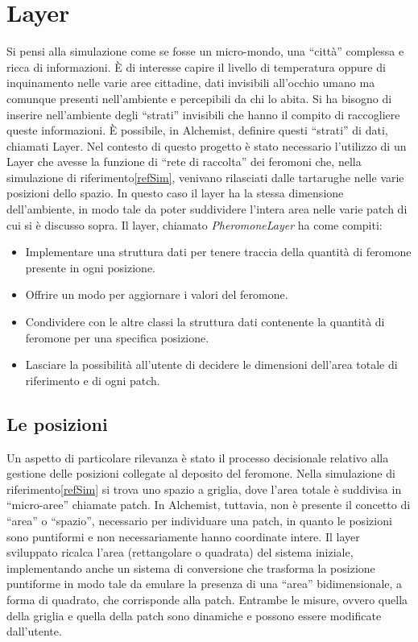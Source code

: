 \documentclass[12pt,a4paper,openright,twoside]{book}
\begin{document}
\section{Layer}
Si pensi alla simulazione come se fosse un micro-mondo, una ``città'' complessa
e ricca di informazioni. È di interesse capire il livello di temperatura oppure di inquinamento nelle varie aree cittadine, dati invisibili
all'occhio umano ma comunque presenti nell'ambiente e percepibili da chi lo abita. Si ha bisogno
di inserire nell'ambiente degli ``strati'' invisibili che hanno il compito di raccogliere queste informazioni.
È possibile, in Alchemist, definire questi ``strati'' di dati, chiamati Layer.
\newline
Nel contesto di questo progetto è stato necessario l'utilizzo di un Layer che avesse la funzione di ``rete di raccolta''
dei feromoni che, nella simulazione di riferimento\space\ref{refSim}, venivano rilasciati dalle tartarughe nelle varie posizioni
dello spazio. In questo caso il layer ha la stessa dimensione dell'ambiente, in modo tale da poter suddividere l'intera area nelle varie patch di cui si 
è discusso sopra.
Il layer, chiamato \textit{PheromoneLayer} ha come compiti:
\begin{itemize}
    \item Implementare una struttura dati per tenere traccia della quantità di feromone presente in ogni posizione.
    \item Offrire un modo per aggiornare i valori del feromone.
    \item Condividere con le altre classi la struttura dati contenente la quantità di feromone per una specifica posizione.
    \item Lasciare la possibilità all'utente di decidere le dimensioni dell'area totale di riferimento e di ogni patch.
\end{itemize}

\subsection{Le posizioni}
Un aspetto di particolare rilevanza è stato il processo decisionale relativo alla gestione delle posizioni collegate 
al deposito del feromone. Nella simulazione di riferimento\space\ref{refSim} si trova uno spazio a griglia, dove l'area totale è suddivisa
in ``micro-aree'' chiamate patch. In Alchemist, tuttavia, non è presente il concetto di ``area'' o ``spazio'', necessario per individuare una patch,
in quanto le posizioni sono puntiformi e non necessariamente hanno coordinate intere. Il layer sviluppato ricalca l'area (rettangolare o quadrata) del sistema iniziale,
implementando anche un sistema di conversione che trasforma la posizione puntiforme in modo tale da emulare la presenza di una ``area'' bidimensionale, a forma di quadrato, che corrisponde alla patch.
Entrambe le misure, ovvero quella della griglia e quella della patch sono dinamiche e possono essere modificate dall'utente.
\end{document}
